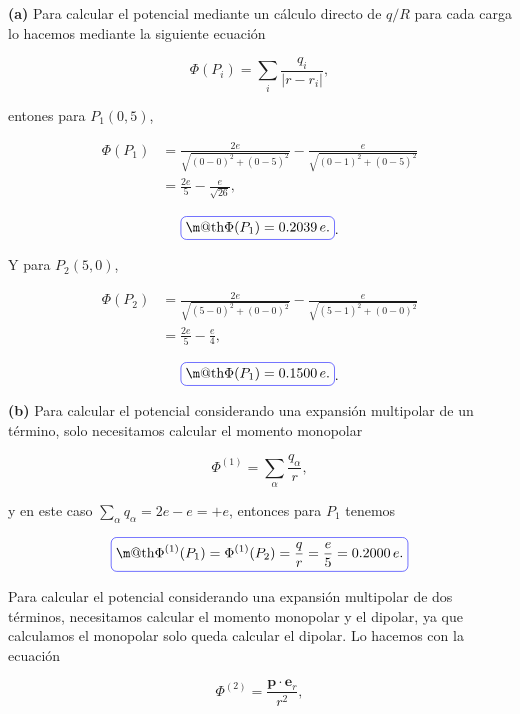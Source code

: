 \documentclass[a4paper,11pt]{article}
\makeatletter
\numberwithin{equation}{section}
\newcommand*{\boxcolor}{blue}
\renewcommand{\boxed}[1]{\textcolor{\boxcolor}{%
\tikz[baseline={([yshift=-1ex]current bounding box.center)}] \node [rectangle, minimum width=1ex,rounded corners,draw] {\normalcolor\m@th$\displaystyle#1$};}}
\makeatother
\begin{document}
\textbf{(a)} Para calcular el potencial mediante un cálculo directo de $q/R$ para 
cada carga lo hacemos mediante la siguiente ecuación 

\begin{equation}
 \Phi(P_i) = \sum_i \frac{q_i}{|r-r_i|},
\end{equation}

entones para $P_1(0,5)$, 

\begin{align*}
 \Phi(P_1) &= \frac{2e}{\sqrt{(0-0)^2 + (0 - 5)^2}} - \frac{e}{\sqrt{(0-1)^2 + 
 (0 - 5)^2}} \\ 
 &= \frac{2e}{5} - \frac{e}{\sqrt{26}},
\end{align*}

\begin{equation}
 \boxed{\Phi(P_1) = 0.2039 \, e.}.
\end{equation}

Y para $P_2(5,0)$, 

\begin{align*}
 \Phi(P_2) &= \frac{2e}{\sqrt{(5-0)^2 + (0 - 0)^2}} - \frac{e}{\sqrt{(5-1)^2 + 
 (0 - 0)^2}} \\ 
 &= \frac{2e}{5} - \frac{e}{4},
\end{align*}

\begin{equation}
 \boxed{\Phi(P_1) = 0.1500 \, e.}.
\end{equation}

\textbf{(b)} Para calcular el potencial considerando una expansión multipolar 
de un término, solo necesitamos calcular el momento monopolar

\begin{equation}
 \Phi^{(1)} = \sum_\alpha \frac{q_\alpha}{r},
\end{equation}

y en este caso $\sum_\alpha q_\alpha = 2e -e = +e$, entonces para $P_1$ tenemos 

\begin{equation}
 \boxed{\Phi^{(1)}(P_1) = \Phi^{(1)}(P_2)  = \frac{q}{r} = \frac{e}{5} = 0.2000 \, e.}
\end{equation}

Para calcular el potencial considerando una expansión multipolar 
de dos términos, necesitamos calcular el momento monopolar y el dipolar, ya que 
calculamos el monopolar solo queda calcular el dipolar. Lo hacemos con la 
ecuación 

\begin{equation}
 \Phi^{(2)} = \frac{\mathbf{p}\cdot \mathbf{e}_r}{r^2},
\end{equation}
\end{document}
